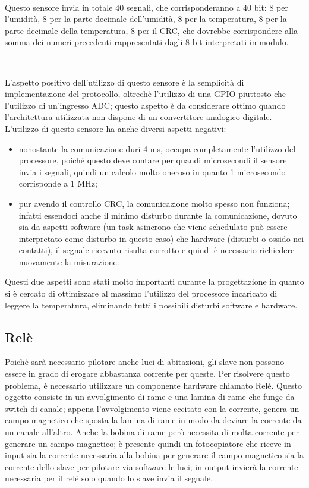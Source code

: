\documentclass[a4paper,titlepage]{book}
\newcommand{\itema}{\begin{itemize}[noitemsep,topsep=10pt,parsep=23pt,partopsep=0pt]}
\begin{document}
~

Questo sensore invia in totale 40 segnali, che corrisponderanno a 40 bit: 8 per l'umidità, 8 per la parte decimale dell'umidità, 8 per la temperatura, 8 per la parte decimale della temperatura, 8 per il CRC, che dovrebbe corrispondere alla somma dei numeri precedenti rappresentati dagli 8 bit interpretati in modulo.

~

L'aspetto positivo dell'utilizzo di questo sensore è la semplicità di implementazione del protocollo, oltrechè l'utilizzo di una GPIO piuttosto che l'utilizzo di un'ingresso ADC; questo aspetto è da considerare ottimo quando l'architettura utilizzata non dispone di un convertitore analogico-digitale. L'utilizzo di questo sensore ha anche diversi aspetti negativi:

\itema

\item nonostante la comunicazione duri 4 ms, occupa completamente l'utilizzo del processore, poiché questo deve contare per quandi microsecondi il sensore invia i segnali, quindi un calcolo molto oneroso in quanto 1 microsecondo corrisponde a 1 MHz;

\item pur avendo il controllo CRC, la comunicazione molto spesso non funziona; infatti essendoci anche il minimo disturbo durante la comunicazione, dovuto sia da aspetti software (un task asincrono che viene schedulato può essere interpretato come disturbo in questo caso) che hardware (disturbi o ossido nei contatti), il segnale ricevuto risulta corrotto e quindi è necessario richiedere nuovamente la misurazione. 

\end{itemize}

Questi due aspetti sono stati molto importanti durante la progettazione in quanto si è cercato di ottimizzare al massimo l'utilizzo del processore incaricato di leggere la temperatura, eliminando tutti i possibili disturbi software e hardware.

\subsection{Relè}

Poichè sarà necessario pilotare anche luci di abitazioni, gli slave non possono essere in grado di erogare abbastanza corrente per queste. Per risolvere questo problema, è necessario utilizzare un componente hardware chiamato Relè. Questo oggetto consiste in un avvolgimento di rame e una lamina di rame che funge da switch di canale; appena l'avvolgimento viene eccitato con la corrente, genera un campo magnetico che sposta la lamina di rame in modo da deviare la corrente da un canale all'altro. Anche la bobina di rame però necessita di molta corrente per generare un campo magnetico; è presente quindi un fotocopiatore che riceve in input sia la corrente necessaria alla bobina per generare il campo magnetico sia la corrente dello slave per pilotare via software le luci; in output invierà la corrente necessaria per il relé solo quando lo slave invia il segnale.
\end{document}
